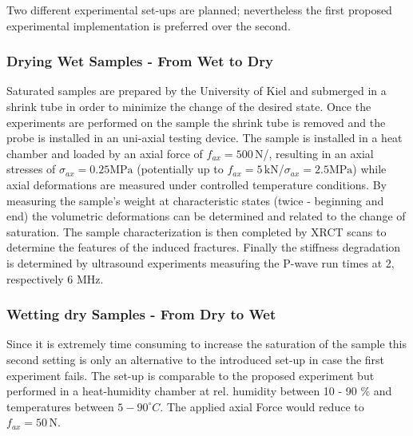 Two different experimental set-ups are planned; nevertheless the first proposed experimental implementation is preferred over the second.

\subsubsection*{Drying Wet Samples - From Wet to Dry}

Saturated samples are prepared by the University of Kiel and submerged in a shrink tube in order to minimize the change of the desired state. Once the experiments are performed on the sample the shrink tube is removed and the probe is installed in an uni-axial testing device. The sample is installed in a heat chamber and loaded by an axial force of $f_{ax} = 500 \, \text{N}$/, resulting in an axial stresses of $ \sigma_{ax} = 0.25 \text{MPa}$ (potentially up to $f_{ax} = 5 \, \text{kN}$/$ \sigma_{ax} = 2.5 \text{MPa}$) while axial deformations are measured under controlled temperature conditions. By measuring the sample's weight at characteristic states (twice - beginning and end) the volumetric deformations can be determined and related to the change of saturation. The sample characterization is then completed by XRCT scans to determine the features of the induced fractures. Finally the stiffness degradation is determined by ultrasound experiments measuŕing the P-wave run times at 2, respectively 6 MHz.

\subsubsection*{Wetting dry Samples - From Dry to Wet}

Since it is extremely time consuming to increase the saturation of the sample this second setting is only an alternative to the introduced set-up in case the first experiment fails. The set-up is comparable to the proposed experiment but performed in a heat-humidity chamber at rel. humidity between 10 - 90 \% and temperatures between $5-90^\circ C$. The applied axial Force would reduce to $f_{ax} = 50 \, \text{N}$.
